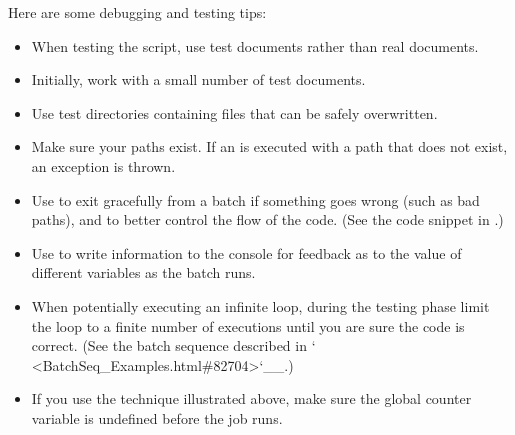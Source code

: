 \documentclass[letterpaper,12pt,english,openany,oneside]{sphinxmanual}
\begin{document}
Here are some debugging and testing tips:
\begin{itemize}
\item {} 
When testing the script, use test documents rather than real documents.

\item {} 
Initially, work with a small number of test documents.

\item {} 
Use test directories containing files that can be safely overwritten.

\item {} 
Make sure your paths exist. If an  is executed with a path that does not exist, an exception is thrown.

\item {} 
Use  to exit gracefully from a batch if something goes wrong (such as bad paths), and to better control the flow of the code. (See the code snippet in .)

\item {} 
Use  to write information to the console for feedback as to the value of different variables as the batch runs.

\item {} 
When potentially executing an infinite loop, during the testing phase limit the loop to a finite number of executions until you are sure the code is correct. (See the batch sequence described in ` <BatchSeq\_Examples.html\#82704>`\_\_.)

\item {} 
If you use the  technique illustrated above, make sure the global counter variable is undefined before the job runs.

\end{itemize}



\renewcommand{\indexname}{Index}
\printindex
\end{document}

